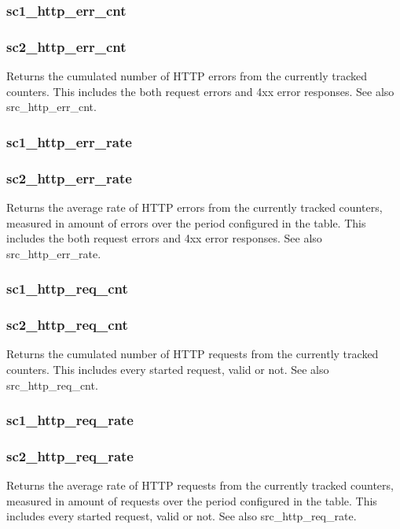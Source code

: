\subsubsection[sc1\_http\_err\_cnt]{sc1\_http\_err\_cnt}
\subsubsection[sc2\_http\_err\_cnt]{sc2\_http\_err\_cnt}
  Returns the cumulated number of HTTP errors from the currently tracked
  counters. This includes the both request errors and 4xx error responses.
  See also src\_http\_err\_cnt.

\subsubsection[sc1\_http\_err\_rate]{sc1\_http\_err\_rate}
\subsubsection[sc2\_http\_err\_rate]{sc2\_http\_err\_rate}
  Returns the average rate of HTTP errors from the currently tracked counters,
  measured in amount of errors over the period configured in the table. This
  includes the both request errors and 4xx error responses. See also
  src\_http\_err\_rate.

\subsubsection[sc1\_http\_req\_cnt]{sc1\_http\_req\_cnt}
\subsubsection[sc2\_http\_req\_cnt]{sc2\_http\_req\_cnt}
  Returns the cumulated number of HTTP requests from the currently tracked
  counters. This includes every started request, valid or not. See also
  src\_http\_req\_cnt.

\subsubsection[sc1\_http\_req\_rate]{sc1\_http\_req\_rate}
\subsubsection[sc2\_http\_req\_rate]{sc2\_http\_req\_rate}
  Returns the average rate of HTTP requests from the currently tracked
  counters, measured in amount of requests over the period configured in
  the table. This includes every started request, valid or not. See also
  src\_http\_req\_rate.

